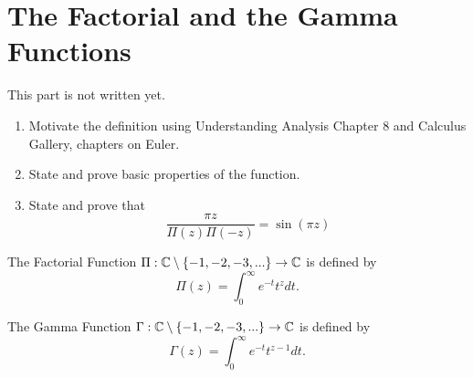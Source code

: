 \chapter{The Factorial and the Gamma Functions}\label{chap:GammaFunction}

This part is not written yet.

\td
\begin{enumerate}
    \item Motivate the definition using Understanding Analysis Chapter 8 and Calculus Gallery, chapters on Euler.
    \item State and prove basic properties of the function.
    \item State and prove that
    $$\frac{\pi z}{\Pi(z)\Pi(-z)} = \sin(\pi z)$$
\end{enumerate}
\td

\begin{definition}
    The Factorial Function $\Pi : \mathbb{C} \setminus \{-1, -2, -3, ...\} \to \mathbb{C}$ is defined by
    $$\Pi(z) = \int_{0}^{\infty}e^{-t}t^z dt.$$
\end{definition}

\begin{definition}
    The Gamma Function $\Gamma : \mathbb{C} \setminus \{-1, -2, -3, ...\} \to \mathbb{C}$ is defined by
    $$\Gamma(z) = \int_{0}^{\infty}e^{-t}t^{z-1}dt.$$
\end{definition}